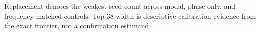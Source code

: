 \begin{table}[htbp]
\centering
\small
\caption{Diagnostics separating feedback from static schedule discovery.}
\label{tab:mechanism}
\vspace{2pt}
\parbox{0.96\linewidth}{\footnotesize Replacement denotes the weakest seed count across modal, phase-only, and frequency-matched controls. Top-38 width is descriptive calibration evidence from the exact frontier, not a confirmation estimand.}
\end{table}
